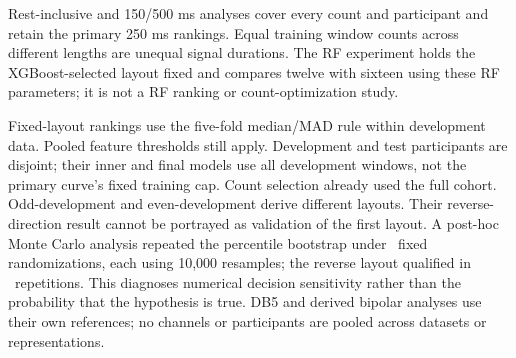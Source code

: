 \documentclass{iopjournal}
\begin{document}
Rest-inclusive and 150/500 ms analyses cover every count and participant and retain the primary 250 ms rankings. Equal training window counts across different lengths are unequal signal durations. The RF experiment holds the XGBoost-selected layout fixed and compares twelve with sixteen using these RF parameters; it is not a RF ranking or count-optimization study.

Fixed-layout rankings use the five-fold median/MAD rule within development data. Pooled feature thresholds still apply. Development and test participants are disjoint; their inner and final models use all development windows, not the primary curve's fixed training cap. Count selection already used the full cohort. Odd-development and even-development derive different layouts. Their reverse-direction result cannot be portrayed as validation of the first layout. A post-hoc Monte Carlo analysis repeated the percentile bootstrap under \FixedLayoutMonteCarloN\ fixed randomizations, each using 10,000 resamples; the reverse layout qualified in \FixedLayoutMonteCarloHits\ repetitions. This diagnoses numerical decision sensitivity rather than the probability that the hypothesis is true. DB5 and derived bipolar analyses use their own references; no channels or participants are pooled across datasets or representations.

\clearpage
\end{document}
